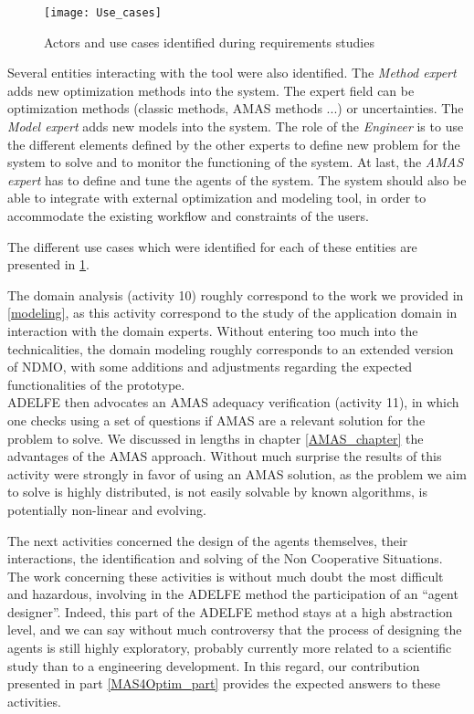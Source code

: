 \begin{figure}
\centering
\texttt{[image: Use\_cases]}
\caption{Actors and use cases identified during requirements studies}\label{Use_cases}
\end{figure}

Several entities interacting with the tool were also identified. The \emph{Method expert} adds new optimization methods into the system. The expert field can be optimization methods (classic methods, AMAS methods ...) or uncertainties. The \emph{Model expert} adds new models into the system. The role of the \emph{Engineer} is to use the different elements defined by the other experts to define new problem for the system to solve and to monitor the functioning of the system. At last, the \emph{AMAS expert} has to define and tune the agents of the system. The system should also be able to integrate with external optimization and modeling tool, in order to accommodate the existing workflow and constraints of the users.

The different use cases which were identified for each of these entities are presented in \figurename{} \ref{Use_cases}.

The domain analysis (activity 10) roughly correspond to the work we provided in \ref{modeling}, as this activity correspond to the study of the application domain in interaction with the domain experts. Without entering too much into the technicalities, the domain modeling roughly corresponds to an extended version of NDMO, with some additions and adjustments regarding the expected functionalities of the prototype.\\
ADELFE then advocates an AMAS adequacy verification (activity 11), in which one checks using a set of questions if AMAS are a relevant solution for the problem to solve. We discussed in lengths in chapter \ref{AMAS_chapter} the advantages of the AMAS approach. Without much surprise the results of this activity were strongly in favor of using an AMAS solution, as the problem we aim to solve  is highly distributed, is not easily solvable by known algorithms, is potentially non-linear and evolving.

The next activities concerned the design of the agents themselves, their interactions, the identification and solving of the Non Cooperative Situations. The work concerning these activities is without much doubt the most difficult and hazardous, involving in the ADELFE method the participation of an \enquote{agent designer}. Indeed, this part of the ADELFE method stays at a high abstraction level, and we can say without much controversy that the process of designing the agents is still highly exploratory, probably currently more related to a scientific study than to a engineering development. In this regard, our contribution presented in part \ref{MAS4Optim_part} provides the expected answers to these activities.

